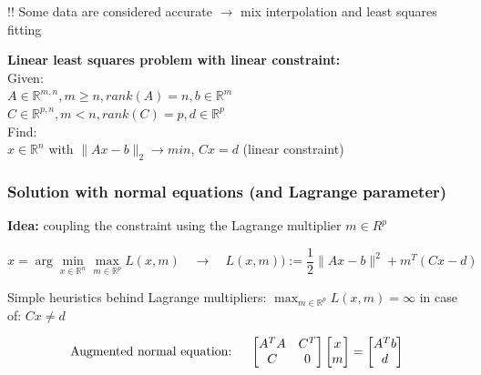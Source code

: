\documentclass[12pt, a4paper]{article}
\newcommand{\R}{\mathbb{R}}
\newcommand{\argmin}{\arg\!\min}
\begin{document}
!! Some data are considered accurate $\rightarrow$ mix interpolation and least squares fitting

\begin{tcolorbox}
\textbf{Linear least squares problem with linear constraint:}
\vspace{2mm} \\
Given: \\
$A \in \R^{m,n}, m \geq n, rank(A) = n, b \in \R^{m}$\\
 $C \in \R^{p,n}, m < n, rank(C) = p, d \in \R^{p}$ \\

Find: \\
$x \in \R^{n}$ with $ \lVert Ax - b\rVert_{2} \rightarrow min $, \quad \quad $Cx =d$ (linear constraint)	
\end{tcolorbox}

\subsubsection{Solution with normal equations (and Lagrange parameter)}

\textbf{Idea:} coupling the constraint using the Lagrange multiplier $m \in R^{p}$

\begin{equation*}
	x = \argmin_{x \in \R^{n}}  \max_{m \in \R^{p}} L(x,m)  \quad \longrightarrow \quad L(x,m) ) := \frac{1}{2} \lVert Ax - b\rVert^{2} + m^{T} (Cx - d)
\end{equation*}

Simple heuristics behind Lagrange multipliers: $\max_{m \in \R^{p}} L(x,m) = \infty $ in case of: $Cx \not = d$

\begin{equation*}
	\text{Augmented normal equation: \quad}
  	\begin{bmatrix}
  		A^{T}A 	& C^{T} \\
  		C 			& 0 
  	\end{bmatrix}
  	\begin{bmatrix}
  		x \\
  		m
  	\end{bmatrix} 
  	=
  	\begin{bmatrix}
  		A^{T}b \\
  		d
  	\end{bmatrix} 
\end{equation*}
\end{document}
